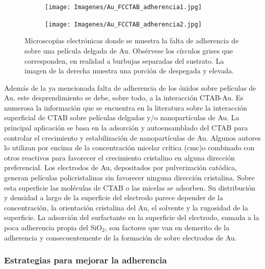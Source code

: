 	     
				\begin{figure}[th]
		 	   	    \begin{subfigure}[t]{0.49\textwidth}
			        	\texttt{[image: Imagenes/Au\_FCCTAB\_adherencia1.jpg]}
			       		\end{subfigure}
					\begin{subfigure}[t]{0.49\textwidth}
			 	   	    \texttt{[image: Imagenes/Au\_FCCTAB\_adherencia2.jpg]}
			       		\end{subfigure}
					 \caption[Adherencia de CTAB sobre electrodos.]{Microscopías electrónicas donde se muestra la falta de adherencia de \pdmC\space sobre una película delgada de Au. Obsérvese los círculos grises que corresponden, en realidad a burbujas separadas del sustrato. La imagen de la derecha muestra una porción de \pdmC\space despegada y elevada.}
					 \label{fig:CTAB_adherencia}	
				     \end{figure}
			
			Además de la ya mencionada falta de adherencia de los óxidos sobre películas de Au, este desprendimiento se debe, sobre todo, a la interacción CTAB-Au. Es numerosa la información que se encuentra en la literatura sobre la interacción superficial de CTAB sobre películas delgadas y/o nanopartículas de Au. La principal aplicación se basa en la adsorción y autoensamblado del CTAB para controlar el crecimiento y estabilización de nanopartículas de Au. \cite{Cheng2003,Smith2008,Meena2013,Wang2013,Hamon2009} Algunos autores lo utilizan por encima de la concentración micelar crítica (cmc)\cite{Lim2014}o combinado con otros reactivos para favorecer el crecimiento cristalino en alguna dirección preferencial\cite{Smith2009}. Los electrodos de Au, depositados por pulverización catódica, generan películas policristalinas sin favorecer ninguna dirección cristalina.\cite{Svorcik2010,Bechelany2010} Sobre esta superficie las moléculas de CTAB o las micelas se adsorben. Su distribución y densidad a largo de la superficie del electrodo parece depender de la concentración, la orientación cristalina del Au, el solvente y la rugosidad de la superficie\cite{Meena2013,Lim2014}. La adsorción del surfactante en la superficie del electrodo, sumada a la poca adherencia propia del SiO$_2$, son factores que van en demerito de la adherencia y consecuentemente de la formación de \pdmC\space sobre electrodos de Au.
							
		\subsubsection{Estrategias para mejorar la adherencia}\label{sec:adherencia}

